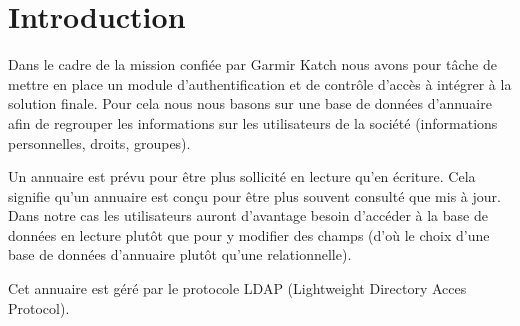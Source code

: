 \documentclass[11pt,fleqn]{report}
\begin{document}
    
\ZMakeCover


\ZMakeTableOfContents

\chapter{Introduction}
Dans le cadre de la mission confiée par Garmir Katch nous avons pour tâche de mettre en place un module d’authentification et de contrôle d’accès à intégrer à la solution finale. Pour cela nous nous basons sur une base de données d’annuaire afin de regrouper les informations sur les utilisateurs de la société (informations personnelles, droits, groupes).

Un annuaire est prévu pour être plus sollicité en lecture qu'en écriture. Cela signifie qu'un annuaire est conçu pour être plus souvent consulté que mis à jour. Dans notre cas les utilisateurs auront d’avantage besoin d’accéder à la base de données en lecture plutôt que pour y modifier des champs (d’où le choix d’une base de données d’annuaire plutôt qu’une relationnelle).

Cet annuaire est géré par le protocole LDAP (Lightweight Directory Acces Protocol).
\end{document}
